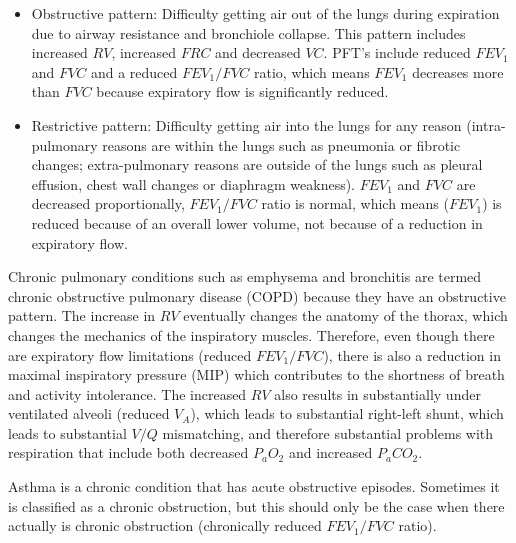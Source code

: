 \begin{itemize}
\item Obstructive pattern: Difficulty getting air out of the lungs during expiration due to airway resistance and bronchiole collapse. This pattern includes increased $RV$, increased $FRC$ and decreased $VC$. PFT's include reduced $FEV_1$ and $FVC$ and a reduced $FEV_1/FVC$ ratio, which means $FEV_1$ decreases more than $FVC$ because expiratory flow is significantly reduced.
\item Restrictive pattern: Difficulty getting air into the lungs for any reason (intra-pulmonary reasons are within the lungs such as pneumonia or fibrotic changes; extra-pulmonary reasons are outside of the lungs such as pleural effusion, chest wall changes or diaphragm weakness). $FEV_1$ and $FVC$ are decreased proportionally, $FEV_1/FVC$ ratio is normal, which means ($FEV_1$) is reduced because of an overall lower volume, not because of a reduction in expiratory flow.
\end{itemize}

Chronic pulmonary conditions such as emphysema and bronchitis are termed chronic obstructive pulmonary disease (COPD) because they have an obstructive pattern. The increase in $RV$ eventually changes the anatomy of the thorax, which changes the mechanics of the inspiratory muscles. Therefore, even though there are expiratory flow limitations (reduced $FEV_1/FVC$), there is also a reduction in maximal inspiratory pressure (MIP) which contributes to the shortness of breath and activity intolerance. The increased $RV$ also results in substantially under ventilated alveoli (reduced $V_A$), which leads to substantial right-left shunt, which leads to substantial $V/Q$ mismatching, and therefore substantial problems with respiration that include both decreased $P_aO_2$ and increased $P_aCO_2$.

Asthma is a chronic condition that has acute obstructive episodes. Sometimes it is classified as a chronic obstruction, but this should only be the case when there actually is chronic obstruction (chronically reduced $FEV_1/FVC$ ratio).

